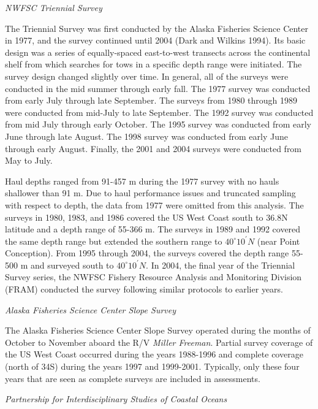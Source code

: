 \documentclass[11pt,
  english,
]{article}
\begin{document}
\emph{NWFSC Triennial Survey}

The Triennial Survey was first conducted by the Alaska Fisheries Science Center in 1977, and the survey continued until 2004 {(Dark and Wilkins 1994)\leavevmode\tagmcend\tagstructend}. Its basic design was a series of equally-spaced east-to-west transects across the continental shelf from which searches for tows in a specific depth range were initiated. The survey design changed slightly over time. In general, all of the surveys were conducted in the mid summer through early fall. The 1977 survey was conducted from early July through late September. The surveys from 1980 through 1989 were conducted from mid-July to late September. The 1992 survey was conducted from mid July through early October. The 1995 survey was conducted from early June through late August. The 1998 survey was conducted from early June through early August. Finally, the 2001 and 2004 surveys were conducted from May to July.

Haul depths ranged from 91-457 m during the 1977 survey with no hauls shallower than 91 m. Due to haul performance issues and truncated sampling with respect to depth, the data from 1977 were omitted from this analysis. The surveys in 1980, 1983, and 1986 covered the US West Coast south to 36.8\textdegree N latitude and a depth range of 55-366 m. The surveys in 1989 and 1992 covered the same depth range but extended the southern range to $40^\circ 10^\prime N$ (near Point Conception). From 1995 through 2004, the surveys covered the depth range 55-500 m and surveyed south to $40^\circ 10^\prime N$. In 2004, the final year of the Triennial Survey series, the NWFSC Fishery Resource Analysis and Monitoring Division (FRAM) conducted the survey following similar protocols to earlier years.

\emph{Alaska Fisheries Science Center Slope Survey}

The Alaska Fisheries Science Center Slope Survey operated during the months of October to November aboard the R/V \emph{Miller Freeman}. Partial survey coverage of the US West Coast occurred during the years 1988-1996 and complete coverage (north of 34\textquotesingle S) during the years 1997 and 1999-2001. Typically, only these four years that are seen as complete surveys are included in assessments.

\emph{Partnership for Interdisciplinary Studies of Coastal Oceans}
\end{document}

